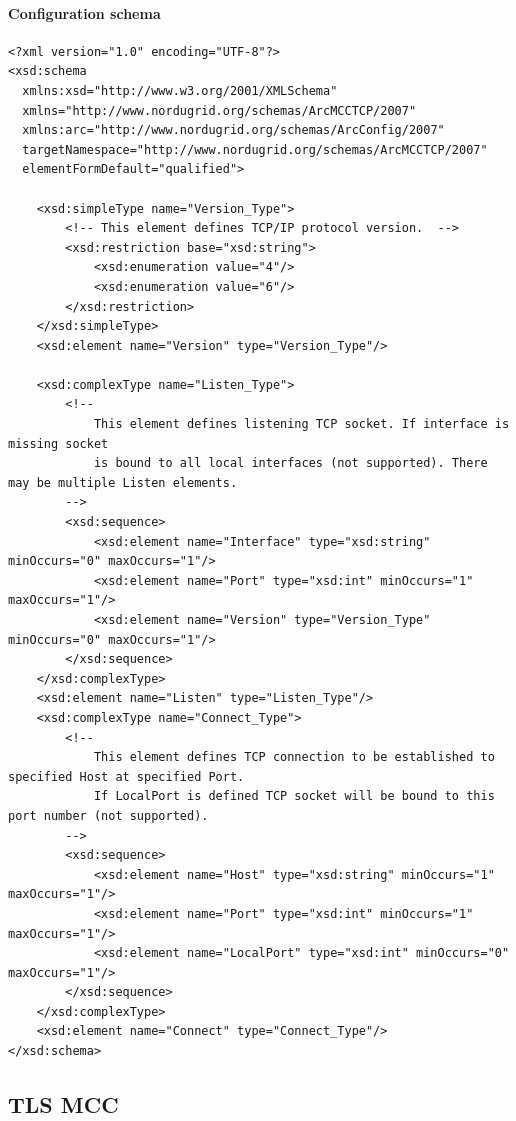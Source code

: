 \documentclass{book}
\begin{document}
\paragraph{Configuration schema}

\begin{verbatim}
<?xml version="1.0" encoding="UTF-8"?>
<xsd:schema
  xmlns:xsd="http://www.w3.org/2001/XMLSchema"
  xmlns="http://www.nordugrid.org/schemas/ArcMCCTCP/2007"
  xmlns:arc="http://www.nordugrid.org/schemas/ArcConfig/2007"
  targetNamespace="http://www.nordugrid.org/schemas/ArcMCCTCP/2007"
  elementFormDefault="qualified">

    <xsd:simpleType name="Version_Type">
        <!-- This element defines TCP/IP protocol version.  -->
        <xsd:restriction base="xsd:string">
            <xsd:enumeration value="4"/>
            <xsd:enumeration value="6"/>
        </xsd:restriction>
    </xsd:simpleType>
    <xsd:element name="Version" type="Version_Type"/>

    <xsd:complexType name="Listen_Type">
        <!--
            This element defines listening TCP socket. If interface is missing socket
            is bound to all local interfaces (not supported). There may be multiple Listen elements.
        -->
        <xsd:sequence>
            <xsd:element name="Interface" type="xsd:string" minOccurs="0" maxOccurs="1"/>
            <xsd:element name="Port" type="xsd:int" minOccurs="1" maxOccurs="1"/>
            <xsd:element name="Version" type="Version_Type" minOccurs="0" maxOccurs="1"/>
        </xsd:sequence>
    </xsd:complexType>
    <xsd:element name="Listen" type="Listen_Type"/>
    <xsd:complexType name="Connect_Type">
        <!--
            This element defines TCP connection to be established to specified Host at specified Port.
            If LocalPort is defined TCP socket will be bound to this port number (not supported).
        -->
        <xsd:sequence>
            <xsd:element name="Host" type="xsd:string" minOccurs="1" maxOccurs="1"/>
            <xsd:element name="Port" type="xsd:int" minOccurs="1" maxOccurs="1"/>
            <xsd:element name="LocalPort" type="xsd:int" minOccurs="0" maxOccurs="1"/>
        </xsd:sequence>
    </xsd:complexType>
    <xsd:element name="Connect" type="Connect_Type"/>
</xsd:schema>
\end{verbatim}


\subsection{TLS MCC}
\end{document}
